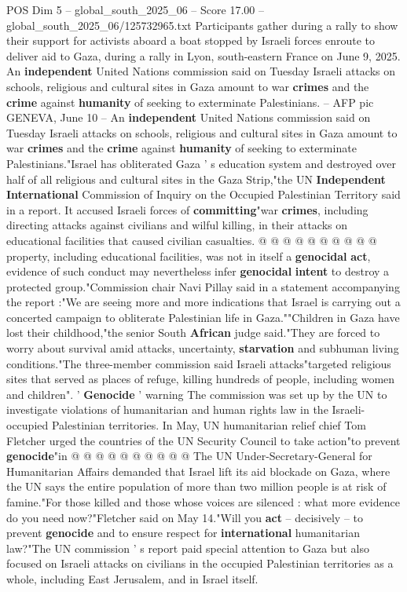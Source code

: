 \begin{textsample}{POS Dim 5 – global\_south\_2025\_06 – Score 17.00 – global\_south\_2025\_06/125732965.txt}  \label{ex:f5_pos_057}
Participants gather during a rally to show their support for activists aboard a boat stopped by Israeli forces enroute to deliver aid to Gaza, during a rally in Lyon, south-eastern France on June 9, 2025.
An \textbf{independent} United Nations commission said on Tuesday Israeli attacks on schools, religious and cultural sites in Gaza amount to war \textbf{crimes} and the \textbf{crime} against \textbf{humanity} of seeking to exterminate Palestinians. -- AFP pic GENEVA, June 10 -- An \textbf{independent} United Nations commission said on Tuesday Israeli attacks on schools, religious and cultural sites in Gaza amount to war \textbf{crimes} and the \textbf{crime} against \textbf{humanity} of seeking to exterminate Palestinians."Israel has obliterated Gaza ' s education system and destroyed over half of all religious and cultural sites in the Gaza Strip,"the UN \textbf{Independent} \textbf{International} Commission of Inquiry on the Occupied Palestinian Territory said in a report.
It accused Israeli forces of \textbf{committing}"war \textbf{crimes}, including directing attacks against civilians and wilful killing, in their attacks on educational facilities that caused civilian casualties. @ @ @ @ @ @ @ @ @ @ property, including educational facilities, was not in itself a \textbf{genocidal} \textbf{act}, evidence of such conduct may nevertheless infer \textbf{genocidal} \textbf{intent} to destroy a protected group."Commission chair Navi Pillay said in a statement accompanying the report :"We are seeing more and more indications that Israel is carrying out a concerted campaign to obliterate Palestinian life in Gaza.""Children in Gaza have lost their childhood,"the senior South \textbf{African} judge said."They are forced to worry about survival amid attacks, uncertainty, \textbf{starvation} and subhuman living conditions."The three-member commission said Israeli attacks"targeted religious sites that served as places of refuge, killing hundreds of people, including women and children". ' \textbf{Genocide} ' warning The commission was set up by the UN to investigate violations of humanitarian and human rights law in the Israeli-occupied Palestinian territories.
In May, UN humanitarian relief chief Tom Fletcher urged the countries of the UN Security Council to take action"to prevent \textbf{genocide}"in @ @ @ @ @ @ @ @ @ @ The UN Under-Secretary-General for Humanitarian Affairs demanded that Israel lift its aid blockade on Gaza, where the UN says the entire population of more than two million people is at risk of famine."For those killed and those whose voices are silenced : what more evidence do you need now?"Fletcher said on May 14."Will you \textbf{act} -- decisively -- to prevent \textbf{genocide} and to ensure respect for \textbf{international} humanitarian law?"The UN commission ' s report paid special attention to Gaza but also focused on Israeli attacks on civilians in the occupied Palestinian territories as a whole, including East Jerusalem, and in Israel itself.

\end{textsample}
